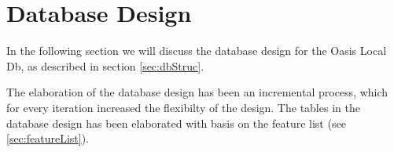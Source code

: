 \section{Database Design}
In the following section we will discuss the database design for the Oasis Local Db, as described in section \vref{sec:dbStruc}.

The elaboration of the database design has been an incremental process, which for every iteration increased the flexibilty of the design.
The tables in the database design has been elaborated with basis on the feature list (see \autoref{sec:featureList}).

